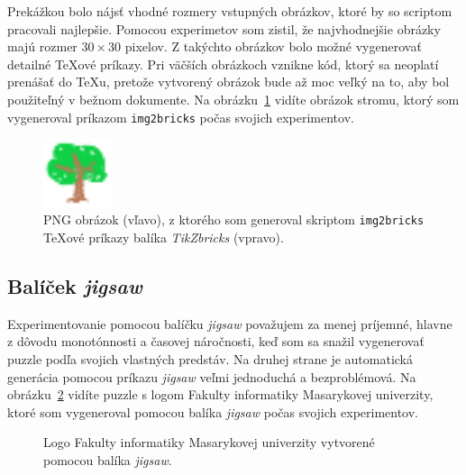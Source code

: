\documentclass{csbulletin}
\newcommand\TikZ{Ti\textit{k}Z}
\begin{document}
Prekážkou bolo nájsť vhodné rozmery vstupných obrázkov, ktoré by so scriptom pracovali najlepšie. Pomocou experimetov som zistil, že najvhodnejšie obrázky majú rozmer $30\times30$ pixelov. Z takýchto obrázkov bolo možné vygenerovať detailné \TeX ové príkazy. Pri väčších obrázkoch vznikne kód, ktorý sa neoplatí prenášať do \TeX u, pretože vytvorený obrázok bude až moc veľký na to, aby bol použiteľný v bežnom dokumente. Na obrázku~\ref{fig:experiment-tree} vidíte obrázok stromu, ktorý som vygeneroval príkazom \texttt{img2bricks} počas svojich experimentov.

\begin{figure}[h]
    \begin{minipage}{\linewidth}
    \centering
    \includegraphics[width=2cm]{simpletree-removebg-preview.png}\qquad
    \relax
    \end{minipage}
    \caption{PNG obrázok (vľavo), z ktorého som generoval skriptom \texttt{img2bricks} \TeX ové príkazy balíka \emph{\TikZ bricks} (vpravo).}
    \label{fig:experiment-tree}
\end{figure}

\vspace*{-0.2cm}

\subsection{Balíček \emph{jigsaw}}

Experimentovanie pomocou balíčku \emph{jigsaw} považujem za menej príjemné, hlavne z dôvodu monotónnosti a časovej náročnosti, keď som sa snažil vygenerovať puzzle podľa svojich vlastných predstáv. Na druhej strane je automatická generácia pomocou príkazu \textit{\emph{jigsaw}} veľmi jednoduchá a bezproblémová. Na obrázku~\ref{fig:logo} vidíte puzzle s logom Fakulty informatiky Masarykovej univerzity, ktoré som vygeneroval pomocou balíka \emph{jigsaw} počas svojich experimentov.

\begin{figure}[h]
    \centering
    \caption{Logo Fakulty informatiky Masarykovej univerzity vytvorené pomocou balíka \emph{jigsaw}.}
    \label{fig:logo}
\end{figure}
\end{document}
